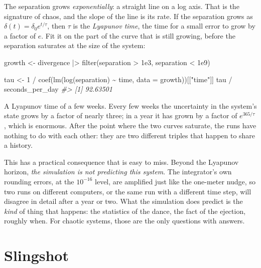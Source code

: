 \documentclass[
  10.5pt,
  letterpaper,
]{scrbook}
\newenvironment{Shaded}{\begin{snugshade}}{\end{snugshade}}
\newcommand{\AttributeTok}[1]{\textcolor[rgb]{0.00,0.00,0.00}{#1}}
\newcommand{\CommentTok}[1]{\textcolor[rgb]{0.00,0.00,0.00}{\textit{#1}}}
\newcommand{\DecValTok}[1]{\textcolor[rgb]{0.00,0.00,0.00}{#1}}
\newcommand{\FloatTok}[1]{\textcolor[rgb]{0.00,0.00,0.00}{#1}}
\newcommand{\FunctionTok}[1]{\textcolor[rgb]{0.00,0.00,0.00}{#1}}
\newcommand{\NormalTok}[1]{\textcolor[rgb]{0.00,0.00,0.00}{#1}}
\newcommand{\OtherTok}[1]{\textcolor[rgb]{0.00,0.00,0.00}{#1}}
\newcommand{\SpecialCharTok}[1]{\textcolor[rgb]{0.00,0.00,0.00}{#1}}
\newcommand{\StringTok}[1]{\textcolor[rgb]{0.00,0.00,0.00}{#1}}
\theoremstyle{plain}
\theoremstyle{remark}
\begin{document}
The separation grows \emph{exponentially}: a straight line on a log
axis. That is the signature of chaos, and the slope of the line is its
rate. If the separation grows as \(\delta(t) = \delta_0 e^{t/\tau}\),
then \(\tau\) is the \emph{Lyapunov time}, the time for a small error to
grow by a factor of \(e\). Fit it on the part of the curve that is still
growing, before the separation saturates at the size of the system:

\begin{Shaded}
\begin{Highlighting}[]
\NormalTok{growth }\OtherTok{\textless{}{-}}\NormalTok{ divergence }\SpecialCharTok{|\textgreater{}}
  \FunctionTok{filter}\NormalTok{(separation }\SpecialCharTok{\textgreater{}} \FloatTok{1e3}\NormalTok{, separation }\SpecialCharTok{\textless{}} \FloatTok{1e9}\NormalTok{)}

\NormalTok{tau }\OtherTok{\textless{}{-}} \DecValTok{1} \SpecialCharTok{/} \FunctionTok{coef}\NormalTok{(}\FunctionTok{lm}\NormalTok{(}\FunctionTok{log}\NormalTok{(separation) }\SpecialCharTok{\textasciitilde{}}\NormalTok{ time, }\AttributeTok{data =}\NormalTok{ growth))[[}\StringTok{"time"}\NormalTok{]]}
\NormalTok{tau }\SpecialCharTok{/}\NormalTok{ seconds\_per\_day}
\CommentTok{\#\textgreater{} [1] 92.63501}
\end{Highlighting}
\end{Shaded}

A Lyapunov time of a few weeks. Every few weeks the uncertainty in the
system's state grows by a factor of nearly three; in a year it has grown
by a factor of \(e^{365/\tau}\), which is enormous. After the point
where the two curves saturate, the runs have nothing to do with each
other: they are two different triples that happen to share a history.

This has a practical consequence that is easy to miss. Beyond the
Lyapunov horizon, \emph{the simulation is not predicting this system}.
The integrator's own rounding errors, at the \(10^{-16}\) level, are
amplified just like the one-meter nudge, so two runs on different
computers, or the same run with a different time step, will disagree in
detail after a year or two. What the simulation does predict is the
\emph{kind} of thing that happens: the statistics of the dance, the fact
of the ejection, roughly when. For chaotic systems, those are the only
questions with answers.

\section{Slingshot}\label{slingshot}
\end{document}
